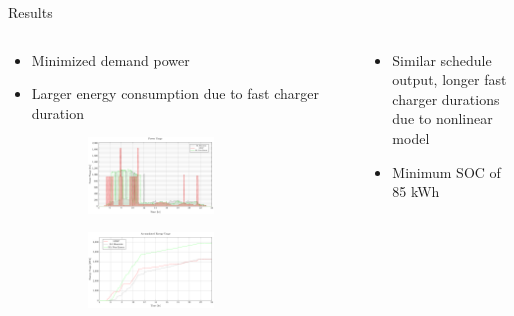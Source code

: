\documentclass[aspectratio=169]{beamer}
\begin{document}
\begin{frame}[label={sec:orge184ebb}]{Results}
\begin{columns}
\begin{column}{0.5\columnwidth}
{\scriptsize
\begin{itemize}
\item Minimized demand power
\item Larger energy consumption due to fast charger duration
\end{itemize}
}

\begin{figure}
\begin{subfigure}[t]{\textwidth}
\centering
    \includegraphics[width=0.7\textwidth]{img/sa-nonlinear/power-sa-nonlinear}
\end{subfigure}
\begin{subfigure}[t]{\textwidth}
\centering
    \includegraphics[width=0.7\textwidth]{img/sa-nonlinear/energy-sa-nonlinear}
\end{subfigure}
\end{figure}
\end{column}

\begin{column}{0.5\columnwidth}
{\scriptsize
\begin{itemize}
\item Similar schedule output, longer fast charger durations due to nonlinear model
\item Minimum SOC of 85 kWh
\end{itemize}
}


\end{column}
\end{columns}
\end{frame}
\end{document}
